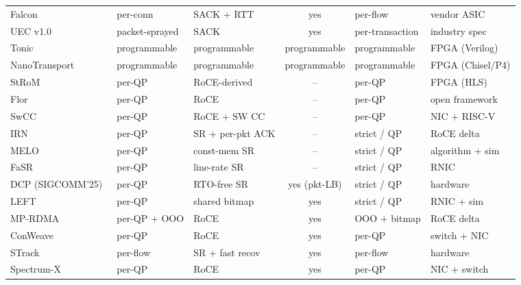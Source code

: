 \documentclass[10pt,twocolumn]{article}
\begin{document}
\begin{table}[t]
\begin{tabular}{l l l c l l}
Falcon~\cite{google2025:falcon}          & per-conn          & SACK + RTT       & yes          & per-flow        & vendor ASIC \\
UEC v1.0~\cite{uec2025:spec}             & packet-sprayed    & SACK             & yes          & per-transaction & industry spec \\
\midrule
Tonic~\cite{arashloo2020:tonic}          & programmable      & programmable     & programmable & programmable    & FPGA (Verilog) \\
NanoTransport~\cite{ibanez2021:nanotransport} & programmable & programmable     & programmable & programmable    & FPGA (Chisel/P4) \\
StRoM~\cite{strom-eurosys20}             & per-QP            & RoCE-derived     & --           & per-QP          & FPGA (HLS) \\
Flor~\cite{li2023:flor}                  & per-QP            & RoCE             & --           & per-QP          & open framework \\
SwCC~\cite{huang2025:swcc}               & per-QP            & RoCE + SW CC     & --           & per-QP          & NIC + RISC-V \\
\midrule
IRN~\cite{mittal2018:irn}                & per-QP            & SR + per-pkt ACK & --           & strict / QP     & RoCE delta \\
MELO~\cite{lu2017:melo}                  & per-QP            & const-mem SR     & --           & strict / QP     & algorithm + sim \\
FaSR~\cite{huang2024:fasr}               & per-QP            & line-rate SR     & --           & strict / QP     & RNIC \\
DCP (SIGCOMM'25)~\cite{li2025:dcp}       & per-QP            & RTO-free SR      & yes (pkt-LB) & strict / QP     & hardware \\
LEFT~\cite{huang2024:left}               & per-QP            & shared bitmap    & yes          & strict / QP     & RNIC + sim \\
\midrule
MP-RDMA~\cite{lu2018:mprdma}             & per-QP + OOO      & RoCE             & yes          & OOO + bitmap    & RoCE delta \\
ConWeave~\cite{tan2023:conweave}         & per-QP            & RoCE             & yes          & per-QP          & switch + NIC \\
STrack~\cite{strack2024}                 & per-flow          & SR + fast recov  & yes          & per-flow        & hardware \\
Spectrum-X~\cite{nvidia:spectrumx}       & per-QP            & RoCE             & yes          & per-QP          & NIC + switch \\

\end{tabular}
\end{table}
\end{document}
